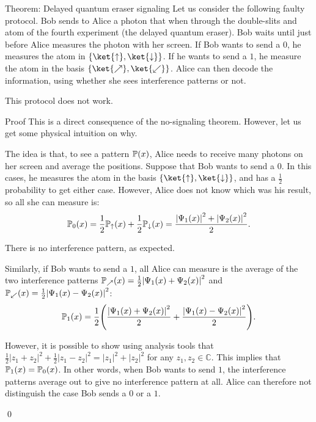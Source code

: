 \documentclass[a4paper]{article}
\begin{document}
\begin{parag}{Theorem: Delayed quantum eraser signaling}
    Let us consider the following faulty protocol. Bob sends to Alice a photon that when through the double-slits and atom of the fourth experiment (the delayed quantum eraser). Bob waits until just before Alice measures the photon with her screen. If Bob wants to send a $0$, he measures the atom in $\left\{\ket{\uparrow}, \ket{\downarrow}\right\}$. If he wants to send a $1$, he measure the atom in the basis $\left\{\ket{\nearrow}, \ket{\swarrow}\right\}$. Alice can then decode the information, using whether she sees interference patterns or not.

    This protocol does not work.

    \begin{subparag}{Proof}
        This is a direct consequence of the no-signaling theorem. However, let us get some physical intuition on why.

        The idea is that, to see a pattern $\prob\left(x\right)$, Alice needs to receive many photons on her screen and average the positions. Suppose that Bob wants to send a $0$. In this cases, he measures the atom in the basis $\left\{\ket{\uparrow}, \ket{\downarrow}\right\}$, and has a $\frac{1}{2}$ probability to get either case. However, Alice does not know which was his result, so all she can measure is: 
        \[\prob_0\left(x\right) = \frac{1}{2} \prob_{\uparrow}\left(x\right) + \frac{1}{2} \prob_{\downarrow}\left(x\right) = \frac{\left|\Psi_1\left(x\right)\right|^2 + \left|\Psi_2\left(x\right)\right|^2}{2}.\]

        There is no interference pattern, as expected.
        
        Similarly, if Bob wants to send a $1$, all Alice can measure is the average of the two interference patterns $\prob_{\nearrow}\left(x\right) = \frac{1}{2} \left|\Psi_1\left(x\right) + \Psi_2\left(x\right)\right|^2$ and $\prob_{\swarrow}\left(x\right) = \frac{1}{2} \left|\Psi_1\left(x\right) - \Psi_2\left(x\right)\right|^2$: 
        \[\prob_1\left(x\right) = \frac{1}{2}\left(\frac{\left|\Psi_1\left(x\right) + \Psi_2\left(x\right)\right|^2}{2} + \frac{\left|\Psi_1\left(x\right) - \Psi_2\left(x\right)\right|^2}{2}\right).\]
        
        However, it is possible to show using analysis tools that $\frac{1}{2}\left|z_1 + z_2\right|^2 + \frac{1}{2}\left|z_1 - z_2\right|^2 = \left|z_1\right|^2 + \left|z_2\right|^2$ for any $z_1, z_2 \in \mathbb{C}$. This implies that $\prob_1\left(x\right) = \prob_0\left(x\right)$. In other words, when Bob wants to send $1$, the interference patterns average out to give no interference pattern at all. Alice can therefore not distinguish the case Bob sends a $0$ or a $1$.

        \qed
    \end{subparag}
\end{parag}
\end{document}
